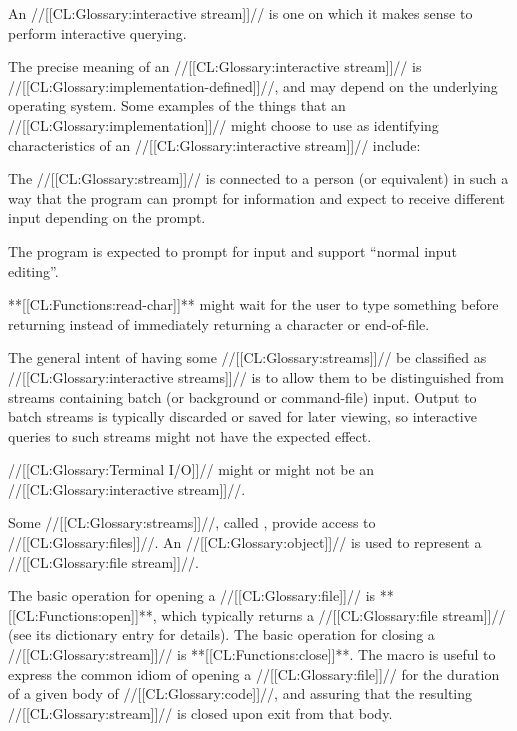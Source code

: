 \endsubsubsubsection%


An //[[CL:Glossary:interactive stream]]// is one on which it makes sense to perform
interactive querying.

The precise meaning of an //[[CL:Glossary:interactive stream]]// is
//[[CL:Glossary:implementation-defined]]//, and may depend on the underlying
operating system.  Some examples of the things that an
//[[CL:Glossary:implementation]]// might choose to use as identifying characteristics
of an //[[CL:Glossary:interactive stream]]// include:

\beginlist

\itemitem{\bull} 
  The //[[CL:Glossary:stream]]// is connected to a person (or equivalent) in such a way
  that the program can prompt for information and expect to receive different
  input depending on the prompt.

\itemitem{\bull}
  The program is expected to prompt for input and support ``normal input editing''.

\itemitem{\bull} 
  **[[CL:Functions:read-char]]** might wait for the user to type something before returning
  instead of immediately returning a character or end-of-file. 

\endlist 

The general intent of having some //[[CL:Glossary:streams]]// be classified as
//[[CL:Glossary:interactive streams]]// is to allow them to be distinguished from
streams containing batch (or background or command-file) input.
Output to batch streams is typically discarded or saved for later viewing, 
so interactive queries to such streams might not have the expected effect.

//[[CL:Glossary:Terminal I/O]]// might or might not be an //[[CL:Glossary:interactive stream]]//.

\endsubsubsubsection%




Some //[[CL:Glossary:streams]]//, called , provide access to //[[CL:Glossary:files]]//.
An //[[CL:Glossary:object]]//  is used to represent a //[[CL:Glossary:file stream]]//.

The basic operation for opening a //[[CL:Glossary:file]]// is **[[CL:Functions:open]]**,
which typically returns a //[[CL:Glossary:file stream]]// 
(see its dictionary entry for details).
The basic operation for closing a //[[CL:Glossary:stream]]// is **[[CL:Functions:close]]**.
The macro  is useful 
to express the common idiom of opening a //[[CL:Glossary:file]]// 
for the duration of a given body of //[[CL:Glossary:code]]//, 
and assuring that the resulting //[[CL:Glossary:stream]]// is closed upon exit from that body.

